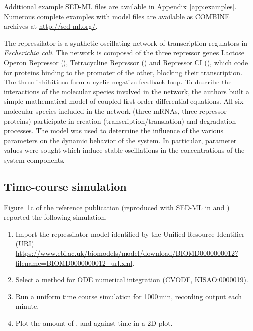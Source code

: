 Additional example SED-ML files are available in Appendix~\ref{app:examples}. Numerous complete examples with model files are available as COMBINE archives at \url{http://sed-ml.org/}.

The repressilator is a synthetic oscillating network of transcription regulators in \textit{Escherichia coli}. The network is composed of the three repressor genes Lactose Operon Repressor (), Tetracycline Repressor () and Repressor CI (), which code for proteins binding to the promoter of the other, blocking their transcription. The three inhibitions form a cyclic negative-feedback loop. To describe the interactions of the molecular species involved in the network, the authors built a simple mathematical model of coupled first-order differential equations. All six molecular species included in the network (three mRNAs, three repressor proteins) participate in creation (transcription/translation) and degradation processes. The model was used to determine the influence of the various parameters on the dynamic behavior of the system. In particular, parameter values were sought which induce stable oscillations in the concentrations of the system components.

\subsection{Time-course simulation}
\label{sec:timecourse}
Figure~1c of the reference publication \citep{Elowitz:2000} (reproduced with SED-ML in  and ) reported the following simulation. 

\begin{enumerate}
 	\item{Import the repressilator model identified by the Unified Resource Identifier (URI) \citep{Berners-Lee:2005}\\ 	\url{https://www.ebi.ac.uk/biomodels/model/download/BIOMD0000000012?filename=BIOMD0000000012_url.xml}.}
 	\item {Select a method for ODE numerical integration (CVODE, KISAO:0000019).}
 	\item{Run a uniform time course simulation for 1000\,min, recording output each minute.}
 	\item{Plot the amount of ,  and  against time in a 2D plot.}
 \end{enumerate}

